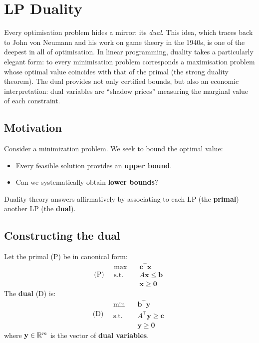 \chapter{LP Duality}
\label{ch:duality}

Every optimisation problem hides a mirror: its \emph{dual}. This idea, which traces back to John von Neumann and his work on game theory in the 1940s, is one of the deepest in all of optimisation. In linear programming, duality takes a particularly elegant form: to every minimisation problem corresponds a maximisation problem whose optimal value coincides with that of the primal (the strong duality theorem). The dual provides not only certified bounds, but also an economic interpretation: dual variables are ``shadow prices'' measuring the marginal value of each constraint.

\section{Motivation}

Consider a minimization problem.  We seek to bound the optimal value:
\begin{itemize}
  \item Every feasible solution provides an \textbf{upper bound}.
  \item Can we systematically obtain \textbf{lower bounds}?
\end{itemize}
Duality theory answers affirmatively by associating to each LP (the
\textbf{primal}) another LP (the \textbf{dual}).

\section{Constructing the dual}

\begin{definition}
\label{def:primal_dual}
Let the primal (P) be in canonical form:
\[
\text{(P)} \quad
\begin{aligned}
  \max \quad & \mathbf{c}^\top \mathbf{x} \\
  \text{s.t.} \quad & A\mathbf{x} \le \mathbf{b} \\
  & \mathbf{x} \ge \mathbf{0}
\end{aligned}
\]
The \textbf{dual} (D) is:
\[
\text{(D)} \quad
\begin{aligned}
  \min \quad & \mathbf{b}^\top \mathbf{y} \\
  \text{s.t.} \quad & A^\top \mathbf{y} \ge \mathbf{c} \\
  & \mathbf{y} \ge \mathbf{0}
\end{aligned}
\]
where $\mathbf{y} \in \mathbb{R}^m$ is the vector of \textbf{dual variables}.
\end{definition}

